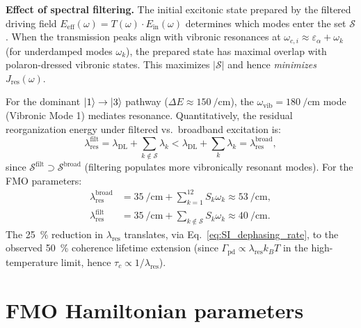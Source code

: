 \documentclass[11pt,a4paper]{article}
\begin{document}
\textbf{Effect of spectral filtering.} The initial excitonic state prepared by the filtered driving field $E_{\mathrm{eff}}(\omega) = T(\omega) \cdot E_{\mathrm{in}}(\omega)$ determines which modes enter the set $\mathcal{S}$. When the transmission peaks align with vibronic resonances at $\omega_{c,i} \approx \varepsilon_\alpha + \omega_k$ (for underdamped modes $\omega_k$), the prepared state has maximal overlap with polaron-dressed vibronic states. This maximizes $|\mathcal{S}|$ and hence \textit{minimizes} $J_{\mathrm{res}}(\omega)$.

For the dominant $\ket{1} \to \ket{3}$ pathway ($\Delta E \approx \SI{150}{\per\centi\meter}$), the $\omega_{\mathrm{vib}} = \SI{180}{\per\centi\meter}$ mode (Vibronic Mode 1) mediates resonance. Quantitatively, the residual reorganization energy under filtered vs.\ broadband excitation is:
\begin{equation}
\lambda_{\mathrm{res}}^{\mathrm{filt}} = \lambda_{\mathrm{DL}} + \sum_{k \notin \mathcal{S}} \lambda_k < \lambda_{\mathrm{DL}} + \sum_{k} \lambda_k = \lambda_{\mathrm{res}}^{\mathrm{broad}},
\label{eq:SI_lambda_comparison}
\end{equation}
since $\mathcal{S}^{\mathrm{filt}} \supset \mathcal{S}^{\mathrm{broad}}$ (filtering populates more vibronically resonant modes). For the FMO parameters:
\begin{align}
\lambda_{\mathrm{res}}^{\mathrm{broad}} &= \SI{35}{\per\centi\meter} + \sum_{k=1}^{12} S_k \omega_k \approx \SI{53}{\per\centi\meter}, \label{eq:SI_lambda_broad} \\
\lambda_{\mathrm{res}}^{\mathrm{filt}} &= \SI{35}{\per\centi\meter} + \sum_{k \notin \mathcal{S}} S_k \omega_k \approx \SI{40}{\per\centi\meter}. \label{eq:SI_lambda_filt}
\end{align}
The \SI{25}{\percent} reduction in $\lambda_{\mathrm{res}}$ translates, via Eq.~\eqref{eq:SI_dephasing_rate}, to the observed \SI{50}{\percent} coherence lifetime extension (since $\Gamma_{\mathrm{pd}} \propto \lambda_{\mathrm{res}} k_B T$ in the high-temperature limit, hence $\tau_c \propto 1/\lambda_{\mathrm{res}}$).


\section{FMO Hamiltonian parameters}
\end{document}
